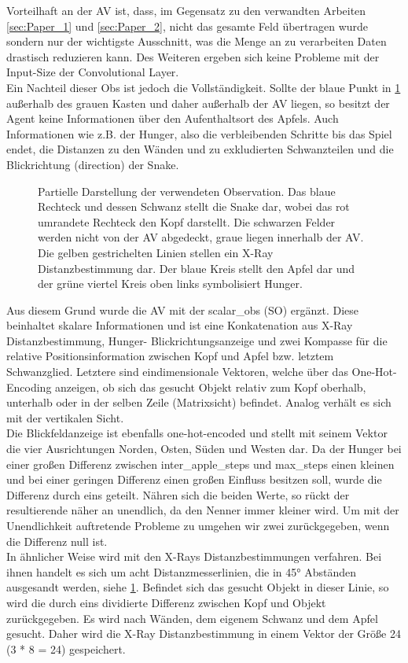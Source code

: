 Vorteilhaft an der AV ist, dass, im Gegensatz zu den verwandten Arbeiten \ref{sec:Paper_1} und \ref{sec:Paper_2}, nicht das gesamte Feld übertragen wurde sondern nur der wichtigste Ausschnitt, was die Menge an zu verarbeiten Daten drastisch reduzieren kann. Des Weiteren ergeben sich keine Probleme mit der Input-Size der Convolutional Layer.\\
Ein Nachteil dieser Obs ist jedoch die Vollständigkeit. Sollte der blaue Punkt in \ref{fig:Observation} außerhalb des grauen Kasten und daher außerhalb der AV liegen, so besitzt der Agent keine Informationen über den Aufenthaltsort des Apfels.
Auch Informationen wie z.B. der Hunger, also die verbleibenden Schritte bis das Spiel endet, die Distanzen zu den Wänden und zu exkludierten Schwanzteilen und die Blickrichtung (direction) der Snake.
\begin{figure}[H]
	\centering
	\def\svgscale{0.95}
	
	\caption[Observation]{Partielle Darstellung der verwendeten Observation. Das blaue Rechteck und dessen Schwanz stellt die Snake dar, wobei das rot umrandete Rechteck den Kopf darstellt. Die schwarzen Felder werden nicht von der AV abgedeckt, graue liegen innerhalb der AV. 
	Die gelben gestrichelten Linien stellen ein X-Ray Distanzbestimmung dar. Der blaue Kreis stellt den Apfel dar und der grüne viertel Kreis oben links symbolisiert Hunger.}
	\label{fig:Observation}
\end{figure}
Aus diesem Grund wurde die AV mit der scalar\_obs (SO) ergänzt. Diese beinhaltet skalare Informationen und ist eine Konkatenation aus X-Ray Distanzbestimmung, Hunger- Blickrichtungsanzeige und zwei Kompasse für die relative Positionsinformation zwischen Kopf und Apfel bzw. letztem Schwanzglied.
Letztere sind eindimensionale Vektoren, welche über das One-Hot-Encoding anzeigen, ob sich das gesucht Objekt relativ zum Kopf oberhalb, unterhalb oder in der selben Zeile (Matrixsicht) befindet. Analog verhält es sich mit der vertikalen Sicht.\\
Die Blickfeldanzeige ist ebenfalls one-hot-encoded und stellt mit seinem Vektor die vier Ausrichtungen Norden, Osten, Süden und Westen dar.
Da der Hunger bei einer großen Differenz zwischen inter\_apple\_steps und max\_steps einen kleinen und bei einer geringen Differenz einen großen Einfluss besitzen soll, wurde die Differenz durch eins geteilt. Nähren sich die beiden Werte, so rückt der resultierende näher an unendlich, da den Nenner immer kleiner wird. Um mit der Unendlichkeit auftretende Probleme zu umgehen wir zwei zurückgegeben, wenn die Differenz null ist.\\
In ähnlicher Weise wird mit den X-Rays Distanzbestimmungen verfahren. Bei ihnen handelt es sich um acht Distanzmesserlinien, die in 45° Abständen ausgesandt werden, siehe \ref{fig:Observation}. Befindet sich das gesucht Objekt in dieser Linie, so wird die durch eins dividierte Differenz zwischen Kopf und Objekt zurückgegeben. Es wird nach Wänden, dem eigenem Schwanz und dem Apfel gesucht. Daher wird die X-Ray Distanzbestimmung in einem Vektor der Größe 24 (3 * 8 = 24) gespeichert.

